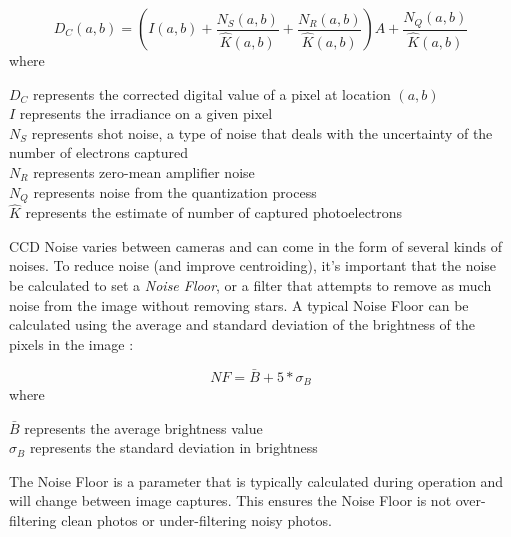 \begin{equation} \label{noise_correction_eq}
    D_C(a,b) = \left( I(a,b) + \frac{N_S(a,b)}{\hat{K}(a,b)} + \frac{N_R(a,b)}{\hat{K}(a,b)} \right)A + \frac{N_Q(a,b)}{\hat{K}(a,b)}
\end{equation}
where

\begin{center}
    $D_C$ represents the corrected digital value of a pixel at location $(a,b)$ \\
    $I$ represents the irradiance on a given pixel \\
    $N_S$ represents shot noise, a type of noise that deals with the uncertainty of the number of electrons captured\\ 
    $N_R$ represents zero-mean amplifier noise \\
    $N_Q$ represents noise from the quantization process \\
    $\hat{K}$ represents the estimate of number of captured photoelectrons
\end{center}
 
\par \qquad CCD Noise varies between cameras and can come in the form of several kinds of noises.
To reduce noise (and improve centroiding), it's important that the noise be calculated to set a \emph{Noise Floor}, or a filter that attempts to remove as much noise from the image without removing stars.
A typical Noise Floor can be calculated using the average and standard deviation of the brightness of the pixels in the image \cite{accuracy_performance_of_star_trackers}:

\begin{equation}
    NF = \bar{B} + 5*\sigma_{B}
\end{equation}
where
\begin{center}
    $\bar{B}$ represents the average brightness value \\
    $\sigma_{B}$ represents the standard deviation in brightness
\end{center}

\par \qquad The Noise Floor is a parameter that is typically calculated during operation and will change between image captures. This ensures the Noise Floor is not over-filtering clean photos or under-filtering noisy photos.

